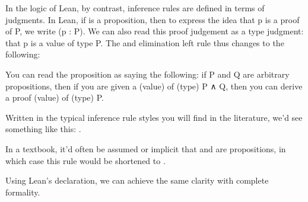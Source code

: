 \documentclass[letterpaper,10pt,english]{sphinxmanual}
\begin{document}
\sphinxAtStartPar
In the logic of Lean, by contrast, inference rules are
defined in terms of  judgments. In Lean, if 
is a proposition, then to express the idea that p is a
proof of P, we write (p : P). We can also read this proof
judgement as a type judgment: that p is a value of type P.
The and elimination left rule thus changes to the following:

\begin{sphinxVerbatim}[commandchars=\\\{\}]
            
\end{sphinxVerbatim}

\sphinxAtStartPar
You can read the proposition as saying the following:
if P and Q are arbitrary propositions, then if you are
given a  (value) of (type) P ∧ Q, then you can
derive a proof (value) of (type) P.

\sphinxAtStartPar
Written in the typical inference rule styles you will
find in the literature, we’d see something like this:
.

\sphinxAtStartPar
In a textbook, it’d often be assumed or implicit that
 and  are propositions, in which case this rule
would be shortened to .

\sphinxAtStartPar
Using Lean’s  declaration, we can achieve
the same clarity with complete formality.
\end{document}
